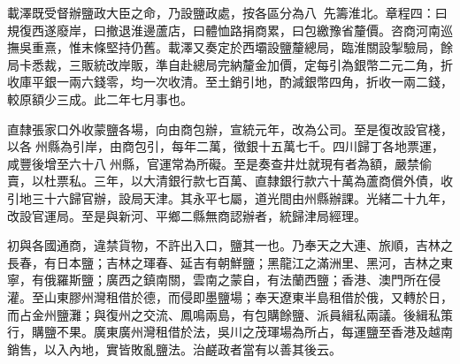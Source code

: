 \begin{pinyinscope}
載澤既受督辦鹽政大臣之命，乃設鹽政處，按各區分為八，先籌淮北。章程四：曰規復西遂廢岸，曰撤退淮邊蘆店，曰體恤路捐商累，曰包繳豫省釐價。咨商河南巡撫吳重熹，惟末條堅持仍舊。載澤又奏定於西壩設鹽釐總局，臨淮關設掣驗局，餘局卡悉裁，三販統改岸販，準自赴總局完納釐金加價，定每引為銀幣二元二角，折收庫平銀一兩六錢零，均一次收清。至土銷引地，酌減銀幣四角，折收一兩二錢，較原額少三成。此二年七月事也。

直隸張家口外收蒙鹽各場，向由商包辦，宣統元年，改為公司。至是復改設官棧，以各州縣為引岸，由商包引，每年二萬，徵銀十五萬七千。四川歸丁各地票運，咸豐後增至六十八州縣，官運常為所礙。至是奏查井灶就現有者為額，嚴禁偷賣，以杜票私。三年，以大清銀行款七百萬、直隸銀行款六十萬為蘆商償外債，收引地三十六歸官辦，設局天津。其永平七屬，道光間由州縣辦課。光緒二十九年，改設官運局。至是與新河、平鄉二縣無商認辦者，統歸津局經理。

初與各國通商，違禁貨物，不許出入口，鹽其一也。乃奉天之大連、旅順，吉林之長春，有日本鹽；吉林之琿春、延吉有朝鮮鹽；黑龍江之滿洲里、黑河，吉林之東寧，有俄羅斯鹽；廣西之鎮南關，雲南之蒙自，有法蘭西鹽；香港、澳門所在侵灌。至山東膠州灣租借於德，而侵即墨鹽場；奉天遼東半島租借於俄，又轉於日，而占金州鹽灘；與復州之交流、鳳鳴兩島，有包購餘鹽、派員緝私兩議。後緝私策行，購鹽不果。廣東廣州灣租借於法，吳川之茂琿場為所占，每運鹽至香港及越南銷售，以入內地，實皆敗亂鹽法。治鹺政者當有以善其後云。


\end{pinyinscope}